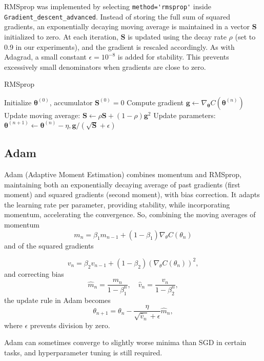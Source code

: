 \documentclass[
 reprint,            %
 amsmath,amssymb,
 aps,
]{revtex4-2}
\begin{document}
RMSprop was implemented by selecting \verb|method='rmsprop'| inside \verb|Gradient_descent_advanced|. Instead of storing the full sum of squared gradients, an exponentially decaying moving average is maintained in a vector $\mathbf{S}$ initialized to zero. At each iteration, $\mathbf{S}$ is updated using the decay rate $\rho$ (set to 0.9 in our experiments), and the gradient is rescaled accordingly.
As with Adagrad, a small constant $\epsilon=10^{-8}$ is added for stability. This prevents excessively small denominators when gradients are close to zero.
\begin{algorithm}[H]
\caption{RMSprop}
\begin{algorithmic}[1]
\State Initialize $\boldsymbol{\theta}^{(0)}$, accumulator $\mathbf{S}^{(0)}=0$
\State Compute gradient $\mathbf{g} \gets \nabla_{\boldsymbol{\theta}} C(\boldsymbol{\theta}^{(n)})$
\State Update moving average: $\mathbf{S} \gets \rho \mathbf{S} + (1-\rho)\mathbf{g}^2$
\State Update parameters: $\boldsymbol{\theta}^{(n+1)} \gets \boldsymbol{\theta}^{(n)} - \eta , \mathbf{g} / (\sqrt{\mathbf{S}}+\epsilon)$
\EndFor
\end{algorithmic}
\end{algorithm}

\subsection{Adam}

Adam (Adaptive Moment Estimation) combines momentum and RMSprop, maintaining both an exponentially decaying average of past gradients (first moment) and squared gradients (second moment), with bias correction\cite{hjorthjensen_week37}. It adapts the learning rate per parameter, providing stability, while incorporating momentum, accelerating the convergence.
So, combining the moving averages of momentum
\[
m_n = \beta_1 m_{n-1} + (1-\beta_1) \nabla_\theta C(\theta_n)
\]  
and of the squared gradients

\[
v_n = \beta_2 v_{n-1} + (1-\beta_2) (\nabla_\theta C(\theta_n))^2,
\]  
and correcting bias
\[
\hat{m}_n = \frac{m_n}{1-\beta_1^n}, \quad \hat{v}_n = \frac{v_n}{1-\beta_2^n},
\]  
the update rule in Adam becomes
\[
\theta_{n+1} = \theta_n - \frac{\eta}{\sqrt{\hat{v}_n}+\epsilon} \hat{m}_n,
\]  
where \(\epsilon\) prevents division by zero.

Adam can sometimes converge to slightly worse minima than SGD in certain tasks, and hyperparameter tuning is still required. \cite{goodfellow2016}
\end{document}
